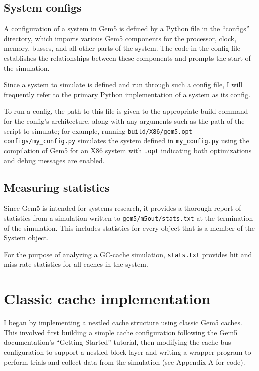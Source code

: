 \documentclass[12pt,twoside]{reedthesis}
\begin{document}
	\subsection*{System configs}

	A configuration of a system in Gem5 is defined by a Python file in the ``configs'' directory, which imports various Gem5 components for the processor, clock, memory, busses, and all other parts of the system. The code in the config file establishes the relationships between these components and prompts the start of the simulation.

	Since a system to simulate is defined and run through such a config file, I will frequently refer to the primary Python implementation of a system as its config.

	To run a config, the path to this file is given to the appropriate build command for the config's architecture, along with any arguments such as the path of the script to simulate; for example, running \verb`build/X86/gem5.opt configs/my_config.py` simulates the system defined in \verb`my_config.py` using the compilation of Gem5 for an X86 system with \verb`.opt` indicating both optimizations and debug messages are enabled.

	\subsection*{Measuring statistics}

	Since Gem5 is intended for systems research, it provides a thorough report of statistics from a simulation written to \verb`gem5/m5out/stats.txt` at the termination of the simulation. This includes statistics for every object that is a member of the System object.

	For the purpose of analyzing a GC-cache simulation, \verb`stats.txt` provides hit and miss rate statistics for all caches in the system.

\section{Classic cache implementation}

	I began by implementing a nestled cache structure using classic Gem5 caches. This involved first building a simple cache configuration following the Gem5 documentation's ``Getting Started'' tutorial, then modifying the cache bus configuration to support a nestled block layer and writing a wrapper program to perform trials and collect data from the simulation (see Appendix A for code).
\end{document}
